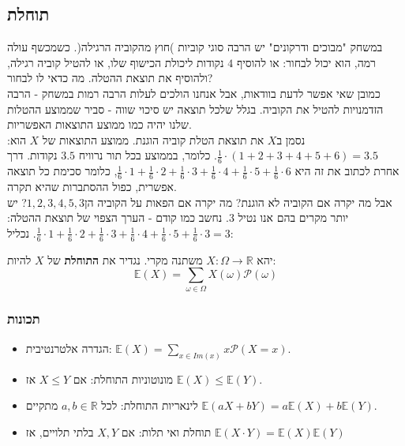 \documentclass{article}
\newcommand{\EE}{\ensuremath{\mathbb{E}}}
\newcommand{\RR}{\ensuremath{\mathbb{R}}}
\newcommand{\Pp}{\ensuremath{\mathcal{P}}}
\begin{document}
\subsection{תוחלת}

במשחק "מבוכים ודרקונים" יש הרבה סוגי קוביות )חוץ מהקוביה הרגילה(. כשמכשף עולה רמה, הוא יכול לבחור: או להוסיף $4$ נקודות ליכולת הכישוף שלו, או להטיל קוביה רגילה, ולהוסיף את תוצאת ההטלה. מה כדאי לו לבחור?\\
כמובן שאי אפשר לדעת בוודאות, אבל אנחנו הולכים לעלות הרבה רמות במשחק - הרבה הזדמנויות להטיל את הקוביה. בגלל שלכל תוצאה יש סיכוי שווה - סביר שממוצע ההטלות שלנו יהיה כמו ממוצע התוצאות האפשריות.\\
נסמן ב$X$ את תוצאת הטלת קוביה הוגנת. ממוצע התוצאות של $X$ הוא:
$\frac{1}{6}\cdot\left(1+2+3+4+5+6\right) = 3.5$. כלומר, בממוצע בכל תור נרוויח $3.5$ נקודות. דרך אחרת לכתוב את זה היא 
$\frac{1}{6} \cdot 1 + \frac{1}{6} \cdot 2 + \frac{1}{6} \cdot 3 + \frac{1}{6} \cdot 4 + \frac{1}{6} \cdot 5 + \frac{1}{6} \cdot 6 $, כלומר סכימת כל תוצאה אפשרית, כפול ההסתברות שהיא תקרה.\\

אבל מה יקרה אם הקוביה לא הוגנת? מה יקרה אם הפאות על הקוביה הן$1,2,3,4,5,3$? יש יותר מקרים בהם אנו נטיל $3$. נחשב כמו קודם - הערך הצפוי של תוצאת ההטלה: $\frac{1}{6} \cdot 1 + \frac{1}{6} \cdot 2 + \frac{1}{6} \cdot 3 + \frac{1}{6} \cdot 4 + \frac{1}{6} \cdot 5 + \frac{1}{6}\cdot 3= 3$. נכליל:
\begin{framed}
יהא
$X:\Omega\to \RR$ משתנה מקרי. נגדיר את \textbf{התוחלת }של $X$ להיות:
$$\EE(X) = \sum_{\omega\in \Omega} X(\omega)\Pp(\omega)$$
\end{framed}
\subsubsection{תכונות}
\begin{itemize}
\item הגדרה אלטרנטיבית:
$\EE(X) = \sum_{x\in Im(x)} x\Pp(X=x)$.
\item מונוטוניות התוחלת: אם 
$X\leq Y$ אז
$\EE(X)\leq \EE(Y)$.
\item לינאריות התוחלת: לכל 
$a,b\in \RR$ מתקיים
$\EE(aX+bY) = a\EE(X) + b\EE(Y)$.
\item תוחלת ואי תלות: אם 
$X,Y$ בלתי תלויים, אז
$\EE(X\cdot Y) = \EE(X)\EE(Y)$
\end{itemize}
\end{document}
